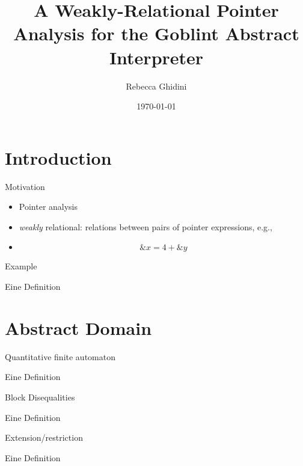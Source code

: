 \documentclass{beamer}
\title{A Weakly-Relational Pointer Analysis for the Goblint Abstract Interpreter}
\author{Rebecca Ghidini}
\date{\today}
\begin{document}
\maketitle

\section{Introduction}
\frame{\tableofcontents[currentsection]}

\begin{frame}{Motivation}
    \begin{Definition}
        \begin{itemize}
            \item Pointer analysis
            \item \emph{weakly} relational: relations between pairs of pointer expressions, e.g.,
            \item \[
            \&x = 4 + \&y
            \]
        \end{itemize}
    \end{Definition}
\end{frame}

\begin{frame}{Example}
    \begin{Definition}
        Eine Definition
    \end{Definition}
\end{frame}

\section{Abstract Domain}
\frame{\tableofcontents[currentsection]}

\begin{frame}{Quantitative finite automaton}
    \begin{Definition}
        Eine Definition
    \end{Definition}
\end{frame}

\begin{frame}{Block Disequalities}
    \begin{Definition}
        Eine Definition
    \end{Definition}
\end{frame}

\begin{frame}{Extension/restriction}
    \begin{Definition}
        Eine Definition
    \end{Definition}
\end{frame}
\end{document}
